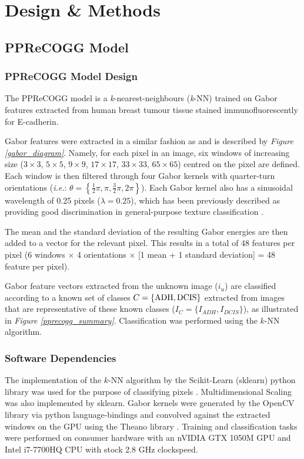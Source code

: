 \chapter{Design \& Methods}
\section{PPReCOGG Model}
\subsection{PPReCOGG Model Design}
The PPReCOGG model is a \emph{k}-nearest-neighbours (\emph{k}-NN) trained on Gabor features extracted from human breast tumour tissue stained immunofluorescently for E-cadherin.\par

Gabor features were extracted in a similar fashion as \cite{melendez2008} and is described by \emph{Figure \ref{gabor_diagram}}. Namely, for each 
pixel in an image, six windows of increasing size ($3\times3$, $5\times5$, $9\times9$, 
$17\times17$, $33\times33$, $65\times65$) centred on the pixel are defined. 
Each window is then filtered through four Gabor kernels with quarter-turn 
orientations (\emph{i.e.}: $\theta = \left\{\frac{1}{2}\pi, \pi, \frac{3}{2}\pi, 
2\pi \right\}$). Each Gabor kernel also has a sinusoidal wavelength of 0.25 pixels 
($\lambda = 0.25$), which has been previously described as providing good 
discrimination in general-purpose texture classification \citep{manjunath1996}.\par

The mean and the standard deviation of the resulting Gabor energies are then
added to a vector for the relevant pixel. This results in a total of 48 features
per pixel (6 windows $\times$ 4 orientations $\times$ [1 mean + 1 standard deviation] = 48
feature per pixel).\par

Gabor feature vectors extracted from the unknown image ($i_u$) are classified according to a known set of classes $C = \{\textnormal{ADH}, \textnormal{DCIS}\}$ extracted from images that are representative of these known classes ($I_C = \{I_{ADH}, I_{DCIS}\}$), as illustrated in \emph{Figure \ref{pprecogg_summary}}. Classification was performed using the $k$-NN algorithm.

\subsection{Software Dependencies}
The implementation of the $k$-NN algorithm by the Scikit-Learn (sklearn) python library was used for the purpose of classifying pixels \citep{pedregosa2011}. Multidimensional Scaling was also implemented by sklearn. Gabor kernels were generated by the OpenCV library via python language-bindings \citep{opencv_library} and convolved against the extracted windows on the GPU using the Theano library \citep{alrfou2016}. Training and classification tasks were performed on consumer hardware with an nVIDIA GTX 1050M GPU and Intel i7-7700HQ CPU with stock 2.8 GHz clockspeed.\par


